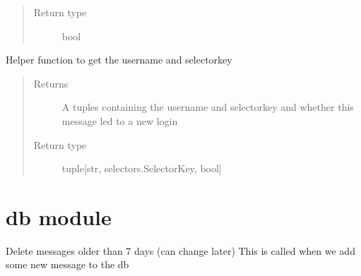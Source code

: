 \documentclass[letterpaper,10pt,english]{sphinxmanual}
\begin{document}
\begin{fulllineitems}
\begin{fulllineitems}
\begin{quote}
\begin{description}
\item[{Return type}] \leavevmode
bool

\end{description}\end{quote}

\end{fulllineitems}


\begin{fulllineitems}
\label{\detokenize{Message:Message.Message.get_uid_selKey}}
Helper function to get the username and selectorkey
\begin{quote}\begin{description}
\item[{Returns}] \leavevmode
A tuples containing the username and selectorkey and whether this message led to a new login

\item[{Return type}] \leavevmode
tuple{[}str, selectors.SelectorKey, bool{]}

\end{description}\end{quote}

\end{fulllineitems}


\end{fulllineitems}



\section{db module}
\label{\detokenize{db:module-db}}\label{\detokenize{db:db-module}}\label{\detokenize{db::doc}}

\begin{fulllineitems}
\label{\detokenize{db:db.deleteOldMessages}}
Delete messages older than 7 days (can change later)
This is called when we add some new message to the db

\end{fulllineitems}
\end{document}
